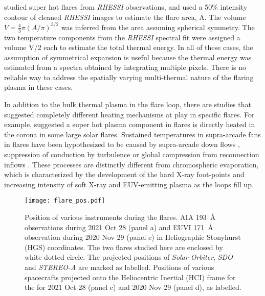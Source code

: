 \cite{caspi10} studied super hot flares from {\it RHESSI} observations, and used a 50\% intensity contour of cleaned {\it RHESSI} images to estimate the flare area, A. The volume $V=\frac{4}{3}\pi (A/\pi)^{3/2}$ was inferred from the area assuming spherical symmetry.  The two temperature components from the {\it RHESSI} spectral fit were assigned a volume V/2 each to estimate the total thermal energy. In all of these cases, the assumption of symmetrical expansion is useful because the thermal energy was estimated from a spectra obtained by integrating multiple pixels. There is no reliable way to address the spatially varying multi-thermal nature of the flaring plasma in these cases. 

In addition to the bulk thermal plasma in the flare loop, there are studies that suggested completely different heating mechanisms at play in specific flares. For example, \citet{longcope11} suggested a super hot plasma component in flares is directly heated in the corona in some large solar flares. Sustained temperatures in supra-arcade fans in flares have been hypothesized to be caused by supra-arcade down flows \citep[e.g.][]{reeves17}, suppression of conduction by turbulence \citep[e.g.][]{xie23} or global compression from reconnection inflows \citep[e.g.][]{reeves19}. These processes are distinctly different from chromospheric evaporation, which is characterized by the development of the hard X-ray foot-points and increasing intensity of soft X-ray and EUV-emitting plasma as the loops fill up.

\begin{figure}[ht!]
    \centering
    \texttt{[image: flare\_pos.pdf]}
    \caption{Position of various instruments during the flares. AIA 193~{\AA} observations during 2021 Oct 28 (panel a) and EUVI 171~{\AA} observation during 2020 Nov 29 (panel c) in Heliographic Stonyhurst (HGS) coordinates. The two flares studied here are enclosed by white dotted circle. The projected positions of {\it Solar Orbiter}, {\it SDO} and {\it STEREO-A} are marked as labelled. Positions of various spacecrafts projected onto the Heliocentric Inertial (HCI) frame for the for 2021 Oct 28 (panel c) and 2020 Nov 29 (panel d), as labelled.}
    \label{fig:sc_pos}
\end{figure}

